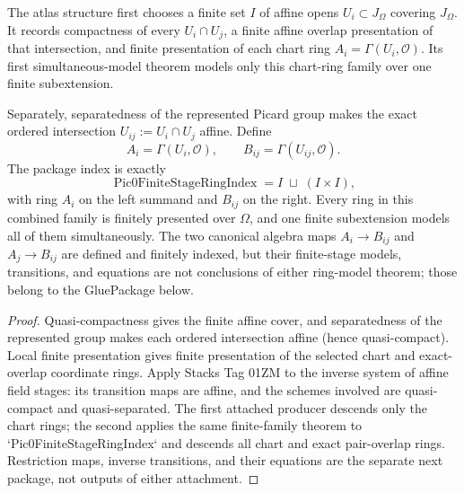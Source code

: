 \begin{theorem}
  \label{route-thm-finite-atlas}
  \leanok

  The atlas structure first chooses a finite set \(I\) of affine opens
  \(U_i\subset J_\Omega\) covering \(J_\Omega\).  It records compactness of
  every \(U_i\cap U_j\), a finite affine overlap presentation of that
  intersection, and finite presentation of each chart ring
  \(A_i=\Gamma(U_i,\mathcal O)\).  Its first simultaneous-model theorem models
  only this chart-ring family over one finite subextension.

  Separately, separatedness of the represented Picard group makes the exact
  ordered intersection \(U_{ij}:=U_i\cap U_j\) affine.  Define
  \[
    A_i=\Gamma(U_i,\mathcal O),\qquad
    B_{ij}=\Gamma(U_{ij},\mathcal O).
  \]
  The package index is exactly
  \[
    \operatorname{Pic0FiniteStageRingIndex}
      = I\;\sqcup\;(I\times I),
  \]
  with ring \(A_i\) on the left summand and \(B_{ij}\) on the right.
  Every ring in this combined family is finitely presented over \(\Omega\),
  and one finite subextension models all of them simultaneously.  The two
  canonical algebra maps \(A_i\to B_{ij}\) and \(A_j\to B_{ij}\) are defined
  and finitely indexed, but their finite-stage models, transitions, and
  equations are not conclusions of either ring-model theorem; those belong to
  the GluePackage below.
\end{theorem}

\begin{proof}
  Quasi-compactness gives the finite affine cover, and separatedness of the
  represented group makes each ordered intersection affine (hence
  quasi-compact).  Local finite presentation gives finite presentation of the
  selected chart and exact-overlap coordinate rings.  Apply Stacks Tag 01ZM to
  the inverse system of affine field stages: its transition maps are affine,
  and the schemes involved are quasi-compact and quasi-separated.  The first
  attached producer descends only the chart rings; the second applies the same
  finite-family theorem to `Pic0FiniteStageRingIndex` and descends all chart and
  exact pair-overlap rings.  Restriction maps, inverse transitions, and their
  equations are the separate next package, not outputs of either attachment.
\end{proof}

